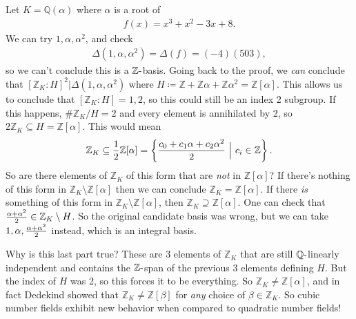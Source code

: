 \begin{example}

Let \(K = {\mathbb{Q}}( \alpha)\) where \(\alpha\) is a root of
\begin{align*}
f(x) = x^3 + x^2 - 3x + 8
.\end{align*}
We can try \(1, \alpha, \alpha^2\), and check
\begin{align*}
{\Delta}(1, \alpha, \alpha^2) = {\Delta}(f) = (-4)(503)
,\end{align*}
so we can't conclude this is a \({\mathbb{Z}}{\hbox{-}}\)basis. Going
back to the proof, we \emph{can} conclude that
\([{\mathbb{Z}}_K: H] ^2 \mathrel{\Big|}{\Delta}(1, \alpha, \alpha^2)\)
where
\(H \coloneqq{\mathbb{Z}}+ {\mathbb{Z}}\alpha + {\mathbb{Z}}\alpha^2 = {\mathbb{Z}}[ \alpha ]\).
This allows us to conclude that \([{\mathbb{Z}}_K: H] = 1, 2\), so this
could still be an index 2 subgroup. If this happens,
\(\# {\mathbb{Z}}_K/H = 2\) and every element is annihilated by 2, so
\(2{\mathbb{Z}}_K \subseteq H = {\mathbb{Z}}[ \alpha ]\). This would
mean
\begin{align*}
{\mathbb{Z}}_K \subseteq {1\over 2} {\mathbb{Z}}[ \alpha ] 
= 
\left\{{ {c_0 + c_1 \alpha + c_2 \alpha^2 \over 2} {~\mathrel{\Big|}~}c_i \in {\mathbb{Z}}}\right\} 
.\end{align*}
So are there elements of \({\mathbb{Z}}_K\) of this form that are
\emph{not} in \({\mathbb{Z}}[ \alpha ]\)? If there's nothing of this
form in \({\mathbb{Z}}_K \setminus{\mathbb{Z}}[ \alpha ]\) then we can
conclude \({\mathbb{Z}}_K = {\mathbb{Z}}[ \alpha ]\). If there \emph{is}
something of this form in
\({\mathbb{Z}}_K \setminus{\mathbb{Z}}[ \alpha ]\), then
\({\mathbb{Z}}_K \supseteq {\mathbb{Z}}[\alpha]\). One can check that
\({\alpha+ \alpha^2 \over 2} \in {\mathbb{Z}}_K \setminus H\). So the
original candidate basis was wrong, but we can take
\(1, \alpha, {\alpha + \alpha^2 \over 2}\) instead, which is an integral
basis.

\end{example}

\begin{remark}

Why is this last part true? These are 3 elements of \({\mathbb{Z}}_K\)
that are still \({\mathbb{Q}}{\hbox{-}}\)linearly independent and
contains the \({\mathbb{Z}}{\hbox{-}}\)span of the previous 3 elements
defining \(H\). But the index of \(H\) was 2, so this forces it to be
everything. So \({\mathbb{Z}}_K \neq {\mathbb{Z}}[ \alpha]\), and in
fact Dedekind showed that \({\mathbb{Z}}_K \neq {\mathbb{Z}}[ \beta]\)
for \emph{any} choice of \(\beta\in {\mathbb{Z}}_K\). So cubic number
fields exhibit new behavior when compared to quadratic number fields!

\end{remark}

